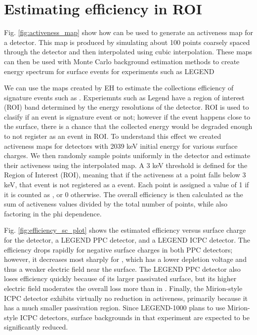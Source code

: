 \section{\label{res:2} Estimating efficiency in ROI}

Fig. \ref{fig:activeness_map} show how {\tdsim} can be used to generate an activeness map for a detector. This map is produced by simulating about 100 points coarsely spaced through the detector and then interpolated using cubic interpolation. These maps can then be used with Monte Carlo background estimation methods to create energy spectrum for surface events for experiments such as LEGEND

We can use the maps created by EH to estimate the collections efficiency of signature events such as {\onbb}. Experiemnts such as Legend have a region of interest (ROI) band determined by the energy resolutions of the detector. ROI is used to clasify if an event is signature event or not; however if the event happens close to the surface, there is a chance that the collected energy would be degraded enough to not register as an event in ROI. To understand this effect we created activeness maps for detectors with 2039 keV initial energy for various surface charges. We then randomly sample points uniformly in the detector and estimate their activeness using the interpolated map. A 3 keV threshold is defined for the Region of Interest (ROI), meaning that if the activeness at a point falls below 3 keV, that event is not registered as a {\onbb} event. Each point is assigned a value of 1 if it is counted as {\onbb}, or 0 otherwise. The overall efficiency is then calculated as the sum of activeness values divided by the total number of points, while also factoring in the phi dependence.

Fig. \ref{fig:efficiency_sc_plot} shows the estimated efficiency versus surface charge for the {\ponama} detector, a LEGEND PPC detector, and a LEGEND ICPC detector. The efficiency drops rapidly for negative surface charges in both PPC detectors; however, it decreases most sharply for {\ponama}, which has a lower depletion voltage and thus a weaker electric field near the surface. The LEGEND PPC detector also loses efficiency quickly because of its larger passivated surface, but its higher electric field moderates the overall loss more than in {\ponama}. Finally, the Mirion-style ICPC detector exhibits virtually no reduction in activeness, primarily because it has a much smaller passivation region. Since LEGEND-1000 plans to use Mirion-style ICPC detectors, surface backgrounds in that experiment are expected to be significantly reduced.

